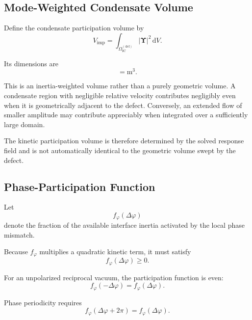 \subsection{Mode-Weighted Condensate Volume}

Define the condensate participation volume by
\begin{equation}
    \boxed{ V_{\mathrm{imp}} = \int_{\Omega_{\mathrm{IC}}^{(\mathrm{def})}} \left| \boldsymbol{\Upsilon} \right|^2 \, \mathrm{d}V }.
\end{equation}

Its dimensions are
\begin{equation}
    [V_{\mathrm{imp}}] = \mathrm{m}^3.
\end{equation}

This is an inertia-weighted volume rather than a purely geometric volume. A condensate region with negligible relative velocity contributes negligibly even when it is geometrically adjacent to the defect. Conversely, an extended flow of smaller amplitude may contribute appreciably when integrated over a sufficiently large domain.

The kinetic participation volume is therefore determined by the solved response field and is not automatically identical to the geometric volume swept by the defect.

\subsection{Phase-Participation Function}

Let
\begin{equation}
    f_{\varphi}(\Delta\varphi)
\end{equation}
denote the fraction of the available interface inertia activated by the local phase mismatch.

Because $f_{\varphi}$ multiplies a quadratic kinetic term, it must satisfy
\begin{equation}
    \boxed{ f_{\varphi}(\Delta\varphi) \geq 0 }.
\end{equation}

For an unpolarized reciprocal vacuum, the participation function is even:
\begin{equation}
    \boxed{ f_{\varphi}(-\Delta\varphi) = f_{\varphi}(\Delta\varphi) }.
\end{equation}

Phase periodicity requires
\begin{equation}
    \boxed{ f_{\varphi} \left( \Delta\varphi+2\pi \right) = f_{\varphi}(\Delta\varphi) }.
\end{equation}

